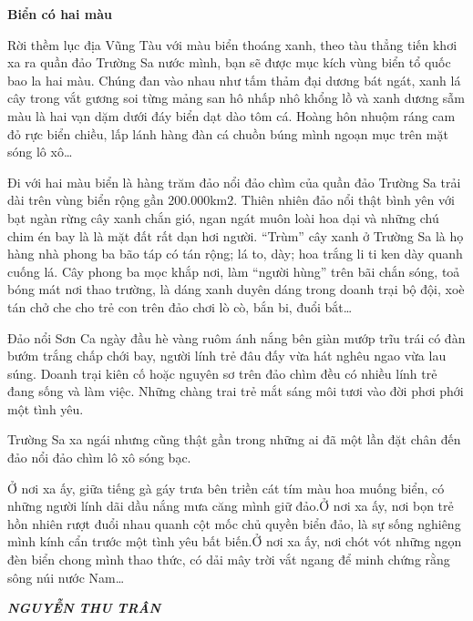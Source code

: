 \def\myytb{}
\def\myqrcodeytb{}
\def\myqrcodezalo{}
\def\quetmaqr{}
\def\thamgianhomhoctap{}
\newpage
\setcounter{ex}{0}

\begin{center}
    {\LARGE\sffamily \textbf{Biển có hai màu}}
\end{center}

Rời thềm lục địa Vũng Tàu với màu biển thoáng xanh, theo tàu thẳng tiến khơi xa ra quần đảo Trường Sa nước mình, bạn sẽ được mục kích vùng biển tổ quốc bao la hai màu. Chúng đan vào nhau như tấm thảm đại dương bát ngát, xanh lá cây trong vắt gương soi từng mảng san hô nhấp nhô khổng lồ và xanh dương sẫm màu là hai vạn dặm dưới đáy biển dạt dào tôm cá. Hoàng hôn nhuộm ráng cam đỏ rực biển chiều, lấp lánh hàng đàn cá chuồn búng mình ngoạn mục trên mặt sóng lô xô…

Đi với hai màu biển là hàng trăm đảo nổi đảo chìm của quần đảo Trường Sa trải dài trên vùng biển rộng gần 200.000km2. Thiên nhiên đảo nổi thật bình yên với bạt ngàn rừng cây xanh chắn gió, ngan ngát muôn loài hoa dại và những chú chim én bay là là mặt đất rất dạn hơi người. “Trùm” cây xanh ở Trường Sa là họ hàng nhà phong ba bão táp có tán rộng; lá to, dày; hoa trắng li ti ken dày quanh cuống lá. Cây phong ba mọc khắp nơi, làm “người hùng” trên bãi chắn sóng, toả bóng mát nơi thao trường, là dáng xanh duyên dáng trong doanh trại bộ đội, xoè tán chở che cho trẻ con trên đảo chơi lò cò, bắn bi, đuổi bắt…

Đảo nổi Sơn Ca ngày đầu hè vàng ruôm ánh nắng bên giàn mướp trĩu trái có đàn bướm trắng chấp chới bay, người lính trẻ đâu đấy vừa hát nghêu ngao vừa lau súng. Doanh trại kiên cố hoặc nguyên sơ trên đảo chìm đều có nhiều lính trẻ đang sống và làm việc. Những chàng trai trẻ mắt sáng môi tươi vào đời phơi phới một tình yêu.

Trường Sa xa ngái nhưng cũng thật gần trong những ai đã một lần đặt chân đến đảo nổi đảo chìm lô xô sóng bạc.

Ở nơi xa ấy, giữa tiếng gà gáy trưa bên triền cát tím màu hoa muống biển, có những người lính dãi dầu nắng mưa căng mình giữ đảo.Ở nơi xa ấy, nơi bọn trẻ hồn nhiên rượt đuổi nhau quanh cột mốc chủ quyền biển đảo, là sự sống nghiêng mình kính cẩn trước một tình yêu bất biến.Ở nơi xa ấy, nơi chót vót những ngọn đèn biển chong mình thao thức, có dải mây trời vắt ngang để minh chứng rằng sông núi nước Nam…

{\vphantom{x} \hfill \textbf{\textit{NGUYỄN THU TRÂN}}}

